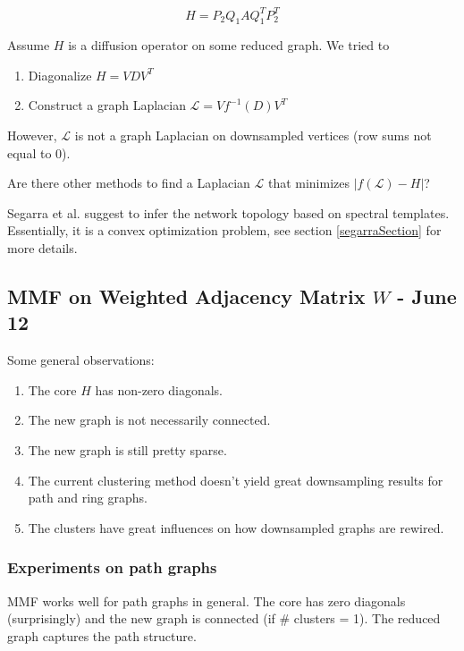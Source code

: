 \documentclass[a4paper]{article}
\newcommand{\La}{\mathcal{L}}
\begin{document}
$$H = P_2Q_1AQ_1^TP_2^T$$

Assume $H$ is a diffusion operator on some reduced graph. We tried to

\begin{enumerate}
\item Diagonalize $H = VDV^T$
\item Construct a graph Laplacian $\La = Vf^{-1}(D)V^T$
\end{enumerate}

However, $\La$ is not a graph Laplacian on downsampled vertices (row sums not equal to 0). 

Are there other methods to find a Laplacian $\La$ that minimizes $|f(\La) - H|$?

Segarra et al. \cite{networktopology} suggest to infer the network topology based on spectral templates. Essentially, it is a convex optimization problem, see section \ref{segarraSection} for more details.

\subsection{MMF on Weighted Adjacency Matrix $W$ - June 12}
Some general observations:
\begin{enumerate}
\item The core $H$ has non-zero diagonals.
\item The new graph is not necessarily connected.
\item The new graph is still pretty sparse.

\item The current clustering method doesn't yield great downsampling results for path and ring graphs. 

\item The clusters have great influences on how downsampled graphs are rewired.
\end{enumerate}

\subsubsection{Experiments on path graphs}
MMF works well for path graphs in general. The core has zero diagonals (surprisingly) and the new graph is connected (if \# clusters = 1). The reduced graph captures the path structure.
\end{document}
